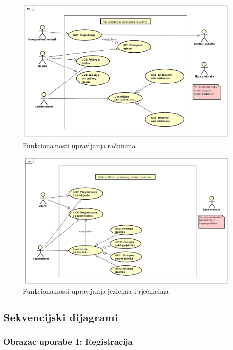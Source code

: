 \begin{figure}[H]
	\includegraphics[scale=0.6]{dijagrami/upravljanje_Racunima.png} 
	\centering
	\caption{Funkcionalnosti upravljanja računima}
	\label{fig:dijagram2}
\end{figure}

\begin{figure}[H]
	\includegraphics[scale=0.6]{dijagrami/upravljanje_rjecnicima.png} 
	\centering
	\caption{Funkcionalnosti upravljanja jezicima i rječnicima}
	\label{fig:dijagram3}
\end{figure}	

\subsection{Sekvencijski dijagrami}

\subsubsection{{Obrazac uporabe 1: Registracija}}


